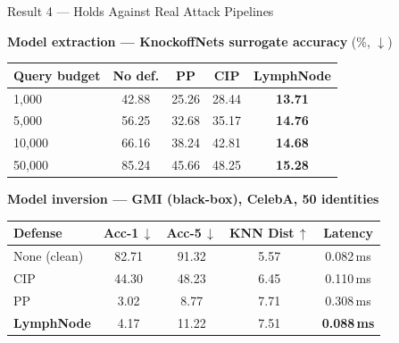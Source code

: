 \documentclass{beamer}
\begin{document}
\begin{frame}{Result 4 --- Holds Against Real Attack Pipelines}
    \scriptsize
    \begin{center}
    \textbf{Model extraction --- KnockoffNets surrogate accuracy} (\%, $\downarrow$)\\[2pt]
    \setlength{\tabcolsep}{8pt}\renewcommand{\arraystretch}{1.1}
    \begin{tabular}{lcccc}
        \toprule
        \textbf{Query budget} & No def. & PP & CIP & \textbf{LymphNode} \\
        \midrule
        1{,}000  & 42.88 & 25.26 & 28.44 & \textbf{13.71} \\
        5{,}000  & 56.25 & 32.68 & 35.17 & \textbf{14.76} \\
        10{,}000 & 66.16 & 38.24 & 42.81 & \textbf{14.68} \\
        50{,}000 & 85.24 & 45.66 & 48.25 & \textbf{15.28} \\
        \bottomrule
    \end{tabular}
    \end{center}

    \vspace{0.18cm}
    \begin{center}
    \textbf{Model inversion --- GMI (black-box), CelebA, 50 identities}\\[2pt]
    \setlength{\tabcolsep}{8pt}\renewcommand{\arraystretch}{1.1}
    \begin{tabular}{lcccc}
        \toprule
        \textbf{Defense} & Acc-1\,$\downarrow$ & Acc-5\,$\downarrow$ & KNN Dist\,$\uparrow$ & Latency \\
        \midrule
        None (clean) & 82.71 & 91.32      & 5.57   & 0.082\,ms \\
        CIP          & 44.30 & 48.23      & 6.45   & 0.110\,ms \\
        PP           & 3.02  & 8.77       & 7.71   & 0.308\,ms \\
        \textbf{LymphNode} & 4.17 & 11.22 & 7.51   & \textbf{0.088\,ms} \\
        \bottomrule
    \end{tabular}
    \end{center}
\end{frame}
\end{document}
